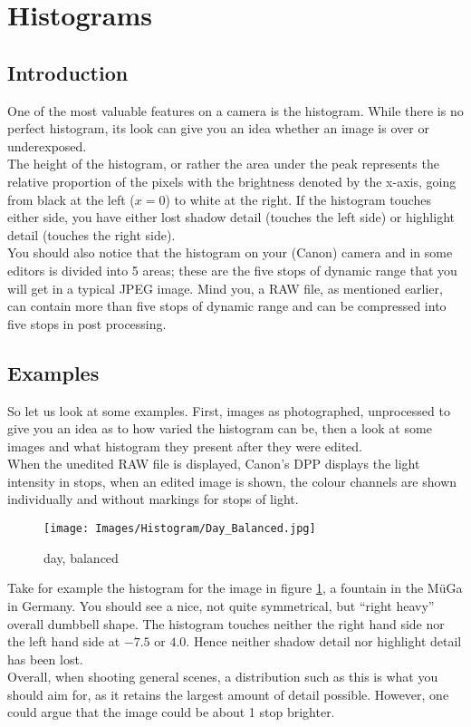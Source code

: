 \section{Histograms}

\subsection{Introduction}

One of the most valuable features on a camera is the histogram. While there is no perfect histogram, its look can give you an idea whether an image is over or underexposed.
\\
The height of the histogram, or rather the area under the peak represents the relative proportion of the pixels with the brightness denoted by the x-axis, going from black at the left ($x=0$) to white at the right. If the histogram touches either side, you have either lost shadow detail (touches the left side) or highlight detail (touches the right side).
\\[\baselineskip]
You should also notice that the histogram on your (Canon) camera and in some editors is divided into 5 areas; these are the five \glspl{stop} of dynamic range that you will get in a typical \gls{JPEG} image. Mind you, a \gls{RAW} file, as mentioned earlier, can contain more than five \glspl{stop} of dynamic range and can be compressed into five \glspl{stop} in post processing.

\subsection{Examples}

So let us look at some examples. First, images as photographed, unprocessed to give you an idea as to how varied the histogram can be, then a look at some images and what histogram they present after they were edited.
\\
When the unedited RAW file is displayed, Canon's \gls{DPP} displays the light intensity in \glspl{stop}, when an edited image is shown, the colour channels are shown individually and without markings for stops of light.

\begin{figure}
	\centering
		\texttt{[image: Images/Histogram/Day\_Balanced.jpg]}
	\caption{day, balanced}
	\label{fig:Day_Balanced}
\end{figure}

Take for example the histogram for the image in figure \ref{fig:Day_Balanced}, a fountain in the M\"{u}Ga in Germany. You should see a nice, not quite symmetrical, but ``right heavy'' overall dumbbell shape. The histogram touches neither the right hand side nor the left hand side at $-7.5$ or $4.0$. Hence neither shadow detail nor highlight detail has been lost.
\\
Overall, when shooting general scenes, a distribution such as this is what you should aim for, as it retains the largest amount of detail possible. However, one could argue that the image could be about 1 \gls{stop} brighter.

